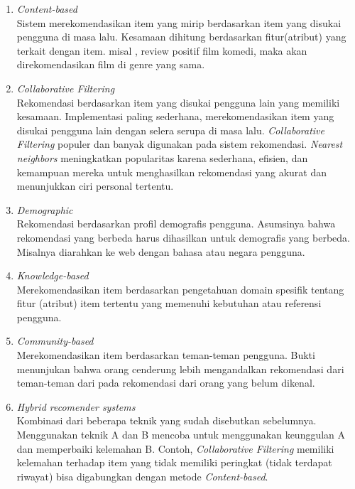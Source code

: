 \begin{enumerate}
	\item \textit{Content-based}\\
		Sistem merekomendasikan item yang mirip berdasarkan item yang disukai pengguna di masa lalu. Kesamaan dihitung berdasarkan fitur(atribut) yang terkait dengan item. misal , review positif film komedi, maka akan direkomendasikan film di genre yang sama. 

	\item \textit{Collaborative Filtering} \\
		 Rekomendasi berdasarkan item yang disukai pengguna lain yang memiliki kesamaan. Implementasi paling sederhana, merekomendasikan item yang disukai pengguna lain dengan selera serupa di masa lalu.  \textit{Collaborative Filtering} populer dan banyak digunakan pada sistem rekomendasi. \textit{Nearest neighbors} meningkatkan popularitas karena sederhana, efisien, dan kemampuan mereka untuk menghasilkan rekomendasi yang akurat dan menunjukkan ciri personal tertentu.
	
	\item \textit{Demographic} \\
		Rekomendasi berdasarkan profil demografis pengguna. Asumsinya bahwa rekomendasi yang berbeda harus dihasilkan untuk demografis yang berbeda. Misalnya diarahkan ke web dengan bahasa atau negara pengguna. 

	\item \textit{Knowledge-based} \\
		Merekomendasikan item berdasarkan pengetahuan domain spesifik tentang fitur (atribut) item tertentu yang memenuhi kebutuhan atau referensi pengguna. 

	\item \textit{Community-based} \\
		Merekomendasikan item berdasarkan teman-teman pengguna. Bukti menunjukan bahwa orang cenderung lebih mengandalkan rekomendasi dari teman-teman dari pada rekomendasi dari orang yang belum dikenal. 

	\item \textit{Hybrid recomender systems} \\
		Kombinasi dari beberapa teknik yang sudah disebutkan sebelumnya. Menggunakan teknik A dan B mencoba untuk menggunakan keunggulan A dan memperbaiki kelemahan B. Contoh, \textit{Collaborative Filtering} memiliki kelemahan terhadap item yang tidak memiliki peringkat (tidak terdapat riwayat) bisa digabungkan dengan metode \textit{Content-based}.
\end{enumerate}


